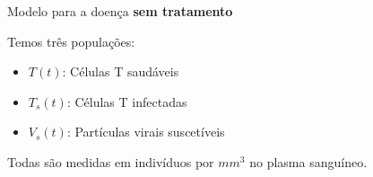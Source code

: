 \documentclass[13pt]{beamer}
\begin{document}
\begin{frame}{Modelo para a doença \textbf{sem tratamento}}

% 
% 

    Temos três populações:
    \begin{itemize}
        \item \( T ( t ) \): Células T saudáveis
        \item \( T_{ s } ( t ) \): Células T infectadas
        \item \( V_{ s } ( t ) \): Partículas virais suscetíveis
    \end{itemize}

    Todas são medidas em indivíduos por \( \unit{mm^{ 3 }} \) no plasma sanguíneo.
    
\end{frame}
\end{document}
